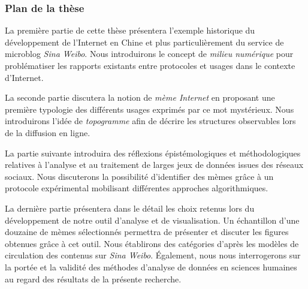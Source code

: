 \subsubsection{Plan de la thèse}

La première partie de cette thèse présentera l'exemple historique du développement de l'Internet en Chine et plus particulièrement du service de microblog \textit{Sina Weibo}. Nous introduirons le concept de \textit{milieu numérique} pour problématiser les rapports existants entre protocoles et usages dans le contexte d'Internet.

La seconde partie discutera la notion de \textit{mème Internet} en proposant une première typologie des différents usages exprimés par ce mot mystérieux. Nous introduirons l'idée de \textit{topogramme} afin de décrire les structures observables lors de la diffusion en ligne.

La partie suivante introduira des réflexions épistémologiques et méthodologiques relatives à l'analyse et au traitement de larges jeux de données issues des réseaux sociaux. Nous discuterons la possibilité d'identifier des mèmes grâce à un protocole expérimental mobilisant différentes approches algorithmiques.

La dernière partie présentera dans le détail les choix retenus lors du développement de notre outil d'analyse et de visualisation. Un échantillon d'une douzaine de mèmes sélectionnés permettra de présenter et discuter les figures obtenues grâce à cet outil. Nous établirons des catégories d'après les modèles de circulation des contenus sur \textit{Sina Weibo}. \'Egalement, nous nous interrogerons sur la portée et la validité des méthodes d'analyse de données en sciences humaines au regard des résultats de la présente recherche.
